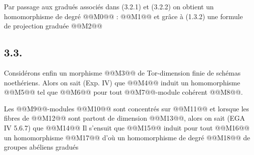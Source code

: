 
Par
passage aux gradués associés dans (3.2.1) et (3.2.2) on obtient un homomorphisme de degré @@M0@@ :
@@M1@@
et grâce à (1.3.2) une formule de projection graduée
@@M2@@

\subsection*{3.3.}
Considérons enfin un morphisme @@M3@@ de Tor-dimension finie de schémas noethériens. Alors on sait (Exp. IV) que @@M4@@ induit un homomorphisme
@@M5@@
tel que
@@M6@@
pour tout @@M7@@-module cohérent @@M8@@.

Les @@M9@@-modules @@M10@@ sont concentrés sur @@M11@@ et lorsque les fibres de @@M12@@ sont partout de dimension @@M13@@, alors on sait (EGA IV 5.6.7) que
@@M14@@
Il s'ensuit que @@M15@@ induit pour tout @@M16@@ un homomorphisme
@@M17@@
d'où un homomorphisme de degré @@M18@@ de groupes abéliens gradués
